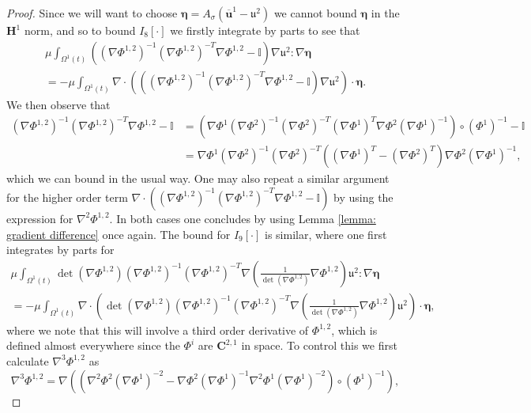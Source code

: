 \documentclass[a4paper]{amsart}
\numberwithin{equation}{section}
\newcommand{\grad}{\nabla}
\newcommand{\Div}{\nabla \cdot}
\theoremstyle{plain}
\newcommand{\mbf}[1]{\mathbf{#1}}
\newcommand{\mbb}[1]{\mathbb{#1}}
\newcommand{\utwo}{\boldsymbol{\mathfrak{u}}^2}
\begin{document}
\begin{proof}
        Since we will want to choose $\boldsymbol{\eta} = A_{\sigma}(\overline{\mbf{u}}^1 - \utwo)$ we cannot bound $\boldsymbol{\eta}$ in the $\mbf{H}^1$ norm, and so to bound $I_8[\cdot]$ we firstly integrate by parts to see that
        \begin{multline*}
            \mu\int_{\Omega^1(t)} \left((\grad \Phi^{1,2})^{-1} (\grad \Phi^{1,2})^{-T} \grad \Phi^{1,2} - \mbb{I}\right) \grad \utwo : \grad \boldsymbol{\eta}\\
            = -\mu\int_{\Omega^1(t)} \Div\left(\left((\grad \Phi^{1,2})^{-1} (\grad \Phi^{1,2})^{-T} \grad \Phi^{1,2} - \mbb{I}\right) \grad \utwo \right) \cdot \boldsymbol{\eta}.
        \end{multline*}
        We then observe that
        \begin{align*}
            (\grad \Phi^{1,2})^{-1} (\grad \Phi^{1,2})^{-T} \grad \Phi^{1,2} - \mbb{I} &= \left( \grad \Phi^1 (\grad \Phi^2)^{-1} (\grad \Phi^2)^{-T} (\grad \Phi^1)^T \grad \Phi^2 (\grad \Phi^1)^{-1} \right) \circ (\Phi^1)^{-1} - \mbb{I}\\
            &= \grad \Phi^1 (\grad \Phi^2)^{-1} (\grad \Phi^2)^{-T} \left( (\grad \Phi^1)^T- (\grad \Phi^2)^T\right)\grad \Phi^2 (\grad \Phi^1)^{-1},
        \end{align*}
        which we can bound in the usual way.
        One may also repeat a similar argument for the higher order term $\Div\left((\grad \Phi^{1,2})^{-1} (\grad \Phi^{1,2})^{-T} \grad \Phi^{1,2} - \mbb{I}\right)$ by using the expression for $\grad^2 \Phi^{1,2}$.
        In both cases one concludes by using Lemma \ref{lemma: gradient difference} once again.
       The bound for $I_9[\cdot]$ is similar, where one first integrates by parts for
       \begin{multline*}
           \mu \int_{\Omega^1(t)} \det(\grad\Phi^{1,2}) (\grad \Phi^{1,2})^{-1} (\grad \Phi^{1,2})^{-T} \grad \left(\frac{1}{\det(\grad \Phi^{1,2})} \grad \Phi^{1,2} \right) \utwo : \grad \boldsymbol{\eta}\\= -\mu \int_{\Omega^1(t)} \Div\left(\det(\grad\Phi^{1,2}) (\grad \Phi^{1,2})^{-1} (\grad \Phi^{1,2})^{-T} \grad \left(\frac{1}{\det(\grad \Phi^{1,2})} \grad \Phi^{1,2} \right) \utwo\right) \cdot\boldsymbol{\eta},
       \end{multline*}
       where we note that this will involve a third order derivative of $\Phi^{1,2}$, which is defined almost everywhere since the $\Phi^i$ are $\mbf{C}^{2,1}$ in space.
       To control this we first calculate $\grad^3 \Phi^{1,2}$ as
       \[ \grad^3 \Phi^{1,2} = \grad \left(\left(\grad^2 \Phi^2 (\grad \Phi^1)^{-2} - \grad \Phi^2 (\grad \Phi^1)^{-1} \grad^2 \Phi^1 (\grad \Phi^1)^{-2}\right)\circ (\Phi^1)^{-1}\right), \]

\end{proof}
\end{document}
